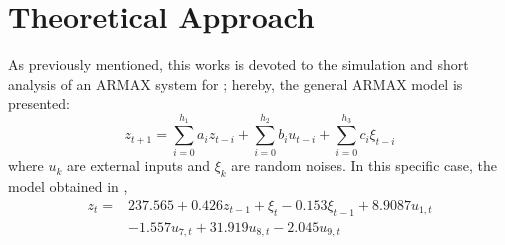 \section{Theoretical Approach}\label{sec:theo}
As previously mentioned, this works is devoted to the simulation and short analysis of an ARMAX system for ; hereby, the general ARMAX model is presented:
\begin{equation}
    z_{t+1}=\sum_{i=0}^{h_1}a_iz_{t-i}+\sum_{i=0}^{h_2}b_iu_{t-i}+\sum_{i=0}^{h_3}c_i\xi_{t-i}
\end{equation}
where $u_k$ are external inputs and $\xi_k$ are random noises. In this specific case, the model obtained in \cite{li2014armax},
\begin{equation}
\begin{aligned} z_{t}=& 237.565+0.426z_{t-1}+\xi_{t}-0.153 \xi_{t-1}+8.9087u_{1, t} \\ &-1.557 u_{7, t}+31.919 u_{8, t}-2.045u_{9, t} \end{aligned}
\end{equation}
